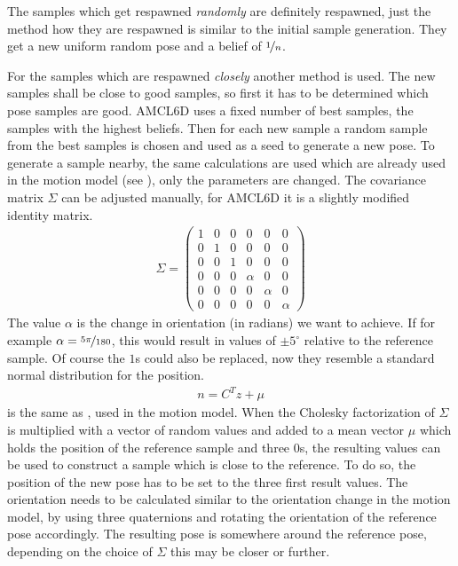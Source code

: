 \documentclass[Thesis.tex]{subfiles}
\begin{document}
The samples which get respawned \emph{randomly} are definitely respawned, just the method how they are respawned is similar to the initial sample generation. They get a new uniform random pose and a belief of $\nicefrac{1}{n}$.

For the samples which are respawned \emph{closely} another method is used. The new samples shall be close to good samples, so first it has to be determined which pose samples are good. \gls{AMCL6D} uses a fixed number of best samples, the samples with the highest beliefs. Then for each new sample a random sample from the best samples is chosen and used as a seed to generate a new pose. To generate a sample nearby, the same calculations are used which are already used in the motion model (see ), only the parameters are changed. The covariance matrix $\Sigma$ can be adjusted manually, for \gls{AMCL6D} it is a slightly modified identity matrix.
\begin{align}
\Sigma = \left(\begin{array}{cccccc}
1 & 0 & 0 & 0 & 0 & 0 \\
0 & 1 & 0 & 0 & 0 & 0 \\
0 & 0 & 1 & 0 & 0 & 0 \\
0 & 0 & 0 & \alpha & 0 & 0 \\
0 & 0 & 0 & 0 & \alpha & 0 \\
0 & 0 & 0 & 0 & 0 & \alpha
\end{array}\right)
\end{align}
The value $\alpha$ is the change in orientation (in radians) we want to achieve. If for example $\alpha = \nicefrac{5\pi}{180}$, this would result in values of $\pm 5^\circ$ relative to the reference sample. Of course the $1$s could also be replaced, now they resemble a standard normal distribution for the position.
%
\begin{align}
n = C^T z + \mu \label{form:mvndsampling2}
\end{align}
 is the same as , used in the motion model. When the Cholesky factorization of $\Sigma$ is multiplied with a vector of random values and added to a mean vector $\mu$ which holds the position of the reference sample and three $0$s, the resulting values can be used to construct a sample which is close to the reference. To do so, the position of the new pose has to be set to the three first result values. The orientation needs to be calculated similar to the orientation change in the motion model, by using three quaternions and rotating the orientation of the reference pose accordingly. The resulting pose is somewhere around the reference pose, depending on the choice of $\Sigma$ this may be closer or further.
\end{document}
